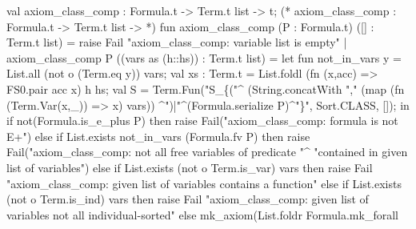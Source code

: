\nwenddocs{}\plusendmoddef\nwstartdeflinemarkup{}\nwenddeflinemarkup
val axiom_class_comp : Formula.t -> Term.t list -> t;
\nwendcode{}\nwdocspar
\nwenddocs{}\plusendmoddef\nwstartdeflinemarkup{}\nwenddeflinemarkup
(* axiom_class_comp : Formula.t -> Term.t list ->  *)
fun axiom_class_comp (P : Formula.t) ([] : Term.t list) =
      raise Fail "axiom_class_comp: variable list is empty"
  | axiom_class_comp P ((vars as (h::hs)) : Term.t list) =
      let
        fun not_in_vars y = List.all (not o (Term.eq y)) vars;
        val xs : Term.t = List.foldl (fn (x,acc) => FS0.pair acc x)
                                     h
                                     hs;
        val S = Term.Fun("S_\{("^
                         (String.concatWith "," (map (fn (Term.Var(x,_)) => x)
                                                     vars))
                         ^")|"^(Formula.serialize P)^"\}",
                         Sort.CLASS,
                         []);
      in
        if not(Formula.is_e_plus P)
        then raise Fail("axiom_class_comp: formula is not E+")
        else if List.exists not_in_vars (Formula.fv P)
        then raise Fail("axiom_class_comp: not all free variables of predicate "^
                        "contained in given list of variables")
        else if List.exists (not o Term.is_var) vars
        then raise Fail "axiom_class_comp: given list of variables contains a function"
        else if List.exists (not o Term.is_ind) vars
        then raise Fail "axiom_class_comp: given list of variables not all individual-sorted"
        else mk_axiom(List.foldr Formula.mk_forall
